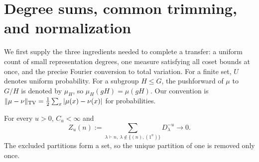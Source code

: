 \section{Degree sums, common trimming, and normalization}
\label{l:foundations}

We first supply the three ingredients needed to complete a transfer: a uniform count of small representation degrees, one measure satisfying all coset bounds at once, and the precise Fourier conversion to total variation. For a finite set, $U$ denotes uniform probability. For a subgroup $H\le G$, the pushforward of $\mu$ to $G/H$ is denoted by $\mu_H$, so $\mu_H(gH)=\mu(gH)$. Our convention is $\|\mu-\nu\|_{\mathrm{TV}}=\frac12\sum_x|\mu(x)-\nu(x)|$ for probabilities.

\begin{lemma}\label{l:degree-basic}
For every $u>0$, $C_u<\infty$ and
\[
 Z_u(n):=\sum_{\lambda\vdash n,\ \lambda\notin\{(n),(1^n)\}}D_\lambda^{-u}\longrightarrow0.
\]
The excluded partitions form a set, so the unique partition of one is removed only once.
\end{lemma}
